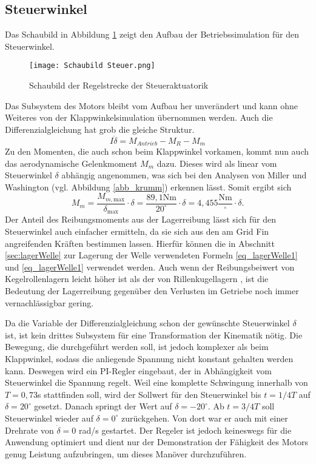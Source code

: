 \subsection{Steuerwinkel}
Das Schaubild in Abbildung \ref{abb_steuerStrecke} zeigt den Aufbau der Betriebssimulation für den Steuerwinkel.
\begin{figure}[h] 
	\centering
	\texttt{[image: Schaubild Steuer.png]}
	\caption{Schaubild der Regelstrecke der Steueraktuatorik}
	\label{abb_steuerStrecke}
\end{figure} 
Das Subsystem des Motors bleibt vom Aufbau her unverändert und kann ohne Weiteres von der Klappwinkelsimulation übernommen werden. Auch die Differenzialgleichung hat grob die gleiche Struktur.
\begin{equation}
	I\ddot{\delta} = M_{Antrieb} - M_{R} - M_{m}
\end{equation}
Zu den Momenten, die auch schon beim Klappwinkel vorkamen, kommt nun auch das aerodynamische Gelenkmoment $M_m$ dazu. Dieses wird als linear vom Steuerwinkel $\delta$ abhängig angenommen, was sich bei den Analysen von Miller und Washington \cite{synopsis} (vgl. Abbildung \ref{abb_krumm}) erkennen lässt. Somit ergibt sich
\begin{equation}
	M_{m} = \frac{M_{m, \mathrm{max}}}{\delta_\mathrm{max}} \cdot \delta =\frac{89,1\mathrm{Nm}}{20^\circ} \cdot \delta = 4,455\frac{\mathrm{Nm}}{^\circ}\cdot \delta.
\end{equation}
Der Anteil des Reibungsmoments aus der Lagerreibung lässt sich für den Steuerwinkel auch einfacher ermitteln, da sie sich aus den am Grid Fin angreifenden Kräften bestimmen lassen. Hierfür können die in Abschnitt \ref{sec:lagerWelle} zur Lagerung der Welle verwendeten Formeln \ref{eq_lagerWelle1} und \ref{eq_lagerWelle1} verwendet werden. Auch wenn der Reibungsbeiwert von Kegelrollenlagern leicht höher ist als der von Rillenkugellagern \cite{lagerreibung}, ist die Bedeutung der Lagerreibung gegenüber den Verlusten im Getriebe noch immer vernachlässigbar gering.

Da die Variable der Differenzialgleichung schon der gewünschte Steuerwinkel $\delta$ ist, ist kein drittes Subsystem für eine Transformation der Kinematik nötig. Die Bewegung, die durchgeführt werden soll, ist jedoch komplexer als beim Klappwinkel, sodass die anliegende Spannung nicht konstant gehalten werden kann. Deswegen wird ein PI-Regler eingebaut, der in Abhängigkeit vom Steuerwinkel die Spannung regelt.
Weil eine komplette Schwingung innerhalb von $T = 0,73$s stattfinden soll, wird der Sollwert für den Steuerwinkel bis $t = 1/4T$ auf $\delta = 20^\circ$ gesetzt. Danach springt der Wert auf $\delta = -20^\circ$. Ab $t = 3/4T$ soll Steuerwinkel wieder auf $\delta = 0^\circ$ zurückgehen. Von dort war er auch mit einer Drehrate von $\dot{\delta} = 0$ rad/s gestartet.
Der Regeler ist jedoch keineswegs für die Anwendung optimiert und dient nur der Demonstration der Fähigkeit des Motors genug Leistung aufzubringen, um dieses Manöver durchzuführen.

